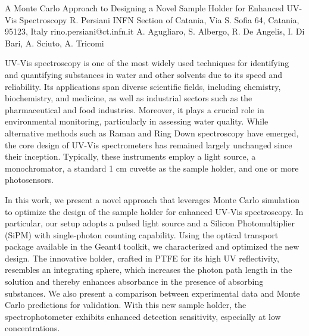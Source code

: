 \begin{talk}
  {A Monte Carlo Approach to Designing a Novel Sample Holder for Enhanced UV-Vis Spectroscopy}%
  {R. Persiani}%
  {INFN Section of Catania, Via S. Sofia 64, Catania, 95123, Italy}%
  {rino.persiani@ct.infn.it}%
  {A. Agugliaro, S. Albergo, R. De Angelis, I. Di Bari, A. Sciuto, A. Tricomi}%
  
    
   
UV-Vis spectroscopy is one of the most widely used techniques for identifying and quantifying substances in water and other solvents due to its speed and reliability. Its applications span diverse scientific fields, including chemistry, biochemistry, and medicine, as well as industrial sectors such as the pharmaceutical and food industries. Moreover, it plays a crucial role in environmental monitoring, particularly in assessing water quality. While alternative methods such as Raman and Ring Down spectroscopy have emerged, the core design of UV-Vis spectrometers has remained largely unchanged since their inception. Typically, these instruments employ a light source, a monochromator, a standard 1 cm cuvette as the sample holder, and one or more photosensors.

In this work, we present a novel approach that leverages Monte Carlo simulation to optimize the design of the sample holder for enhanced UV-Vis spectroscopy. In particular, our setup adopts a pulsed light source and a Silicon Photomultiplier (SiPM) with single-photon counting capability. Using the optical transport package available in the Geant4 toolkit, we characterized and optimized the new design. The innovative holder, crafted in PTFE for its high UV reflectivity, resembles an integrating sphere, which increases the photon path length in the solution and thereby enhances absorbance in the presence of absorbing substances. We also present a comparison between experimental data and Monte Carlo predictions for validation. With this new sample holder, the spectrophotometer exhibits enhanced detection sensitivity, especially at low concentrations.

\medskip

\end{talk}

